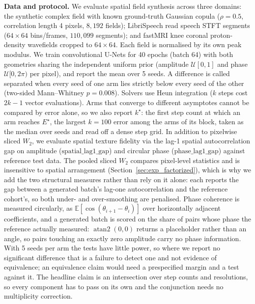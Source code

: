 \textbf{Data and protocol.} We evaluate spatial field synthesis across three domains: the synthetic complex field with known ground-truth Gaussian copula ($\rho = 0.5$, correlation length 4 pixels, $8{,}192$ fields); LibriSpeech read speech STFT segments ($64\times64$ bins/frames, $110{,}099$ segments); and fastMRI knee coronal proton-density wavefields cropped to $64\times64$. Each field is normalised by its own peak modulus. We train convolutional U-Nets for 40 epochs (batch 64) with both geometries sharing the independent uniform prior (amplitude $\mathcal{U}[0,1]$ and phase $\mathcal{U}[0, 2\pi)$ per pixel), and report the mean over 5 seeds. A difference is called separated when every seed of one arm lies strictly below every seed of the other (two-sided Mann--Whitney $p = 0.008$). Solvers use Heun integration ($k$ steps cost $2k-1$ vector evaluations). Arms that converge to different asymptotes cannot be compared by error alone, so we also report $k^\star$: the first step count at which an arm reaches $E^\star$, the largest $k=100$ error among the arms of its block, taken as the median over seeds and read off a dense step grid. In addition to pixelwise sliced $W_2$, we evaluate spatial texture fidelity via the lag-1 spatial autocorrelation gap on amplitude ($\text{spatial\_lag1\_gap}$) and circular phase ($\text{phase\_lag1\_gap}$) against reference test data. The pooled sliced $W_2$ compares pixel-level statistics and is insensitive to spatial arrangement (Section~\ref{sec:exp_factorized}), which is why we add the two structural measures rather than rely on it alone: each reports the gap between a generated batch's lag-one autocorrelation and the reference cohort's, so both under- and over-smoothing are penalised. Phase coherence is measured circularly, as $\mathbb{E}[\cos(\theta_{i+1} - \theta_i)]$ over horizontally adjacent coefficients, and a generated batch is scored on the share of pairs whose phase the reference actually measured: $\operatorname{atan2}(0,0)$ returns a placeholder rather than an angle, so pairs touching an exactly zero amplitude carry no phase information. With 5 seeds per arm the tests have little power, so where we report no significant difference that is a failure to detect one and not evidence of equivalence; an equivalence claim would need a prespecified margin and a test against it. The headline claim is an intersection over step counts and resolutions, so every component has to pass on its own and the conjunction needs no multiplicity correction.

